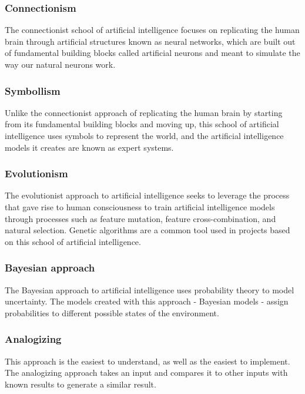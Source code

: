 \documentclass[masterthesis]{fer}
\begin{document}
\subsubsection{Connectionism}
The connectionist school of artificial intelligence focuses on replicating the human brain through artificial structures known as neural networks, which are built out of fundamental building blocks called artificial neurons and meant to simulate the way our natural neurons work.
\subsubsection{Symbollism}
Unlike the connectionist approach of replicating the human brain by starting from its fundamental building blocks and moving up, this school of artificial intelligence uses symbols to represent the world, and the artificial intelligence models it creates are known as expert systems.
\subsubsection{Evolutionism}
The evolutionist approach to artificial intelligence seeks to leverage the process that gave rise to human consciousness to train artificial intelligence models through processes such as feature mutation, feature cross-combination, and natural selection. Genetic algorithms are a common tool used in projects based on this school of artificial intelligence.
\subsubsection{Bayesian approach}
The Bayesian approach to artificial intelligence uses probability theory to model uncertainty. The models created with this approach - Bayesian models - assign probabilities to different possible states of the environment.
\subsubsection{Analogizing}
This approach is the easiest to understand, as well as the easiest to implement. The analogizing approach takes an input and compares it to other inputs with known results to generate a similar result.
\end{document}
